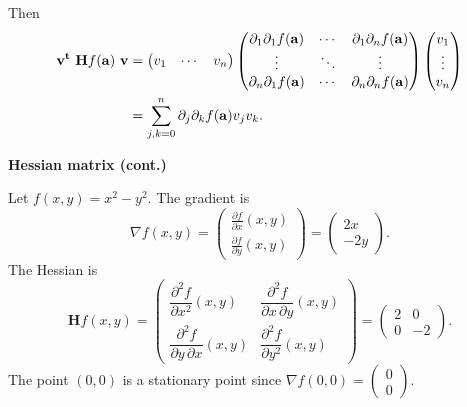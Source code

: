 Then
\[
    \begin{aligned}
        \mathbf{v}^{\mathbf{t}} \ \mathbf{H} f (\mathbf{a}) \ \mathbf{v}
         & =
        \begin{pmatrix}
            v_1 & \cdots & v_n
        \end{pmatrix}
        \begin{pmatrix}
            \partial_{1}\partial_{1}f(\mathbf{a}) & \cdots &
            \partial_{1}\partial_{n}f(\mathbf{a})                   \\
            \vdots                         & \ddots & \vdots \\
            \partial_{n}\partial_{1}f(\mathbf{a}) & \cdots &
            \partial_{n}\partial_{n}f(\mathbf{a})
        \end{pmatrix}
        \begin{pmatrix}
            v_1 \\ \vdots \\v_n
        \end{pmatrix} \\
         & = \sum_{j,k=0}^{n}
        \partial_{j}\partial_{k}f(\mathbf{a})
        v_j v_k.
    \end{aligned}
\]





\textbf{Hessian matrix (cont.)}

\begin{example}
    Let \(f(x,y)=x^2-y^2\).
    The gradient is
    \[\nabla f(x,y) =\begin{pmatrix}
            \frac{\partial f}{\partial x} (x,y) \\[2.2ex]
            \frac{\partial f}{\partial y} (x,y)
        \end{pmatrix} =   \begin{pmatrix}
            2x \\-2y
        \end{pmatrix}.
    \]
    The Hessian is
    \[
        \mathbf{H} f (x,y)= \begin{pmatrix}
            \dfrac{\partial^2 f}{\partial x^2} (x,y)
             & \dfrac{\partial^2 f}{\partial x\,\partial y} (x,y)
            \\[2.2ex]
            \dfrac{\partial^2 f}{\partial y\,\partial x} (x,y)
             & \dfrac{\partial^2 f}{\partial y^2}(x,y)
        \end{pmatrix}
        = \begin{pmatrix}
            2
             & 0
            \\[2.2ex]
            0
             & -2
        \end{pmatrix}.
    \]
    The point \((0,0)\) is a stationary point since \(\nabla f(0,0) =\left(\begin{smallmatrix}
            0\\0
        \end{smallmatrix}\right) \).
\end{example}





